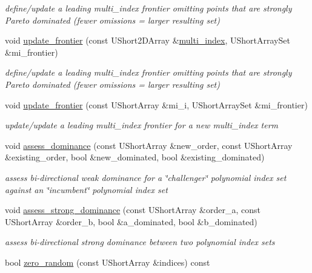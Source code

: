 \begin{DoxyCompactItemize}
\begin{DoxyCompactList}\small\item\em define/update a leading multi\+\_\+index frontier omitting points that are strongly Pareto dominated (fewer omissions = larger resulting set) \end{DoxyCompactList}\item 
void \hyperlink{classPecos_1_1SharedOrthogPolyApproxData_a133e0886ef37cddfd5236be9e89248ca}{update\+\_\+frontier} (const U\+Short2\+D\+Array \&\hyperlink{classPecos_1_1SharedOrthogPolyApproxData_ad93cb921a0df31fce4696f0051fe6a33}{multi\+\_\+index}, U\+Short\+Array\+Set \&mi\+\_\+frontier)\label{classPecos_1_1SharedOrthogPolyApproxData_a133e0886ef37cddfd5236be9e89248ca}

\begin{DoxyCompactList}\small\item\em define/update a leading multi\+\_\+index frontier omitting points that are strongly Pareto dominated (fewer omissions = larger resulting set) \end{DoxyCompactList}\item 
void \hyperlink{classPecos_1_1SharedOrthogPolyApproxData_aac256db072ad293acc50eed9f21bb2b3}{update\+\_\+frontier} (const U\+Short\+Array \&mi\+\_\+i, U\+Short\+Array\+Set \&mi\+\_\+frontier)\label{classPecos_1_1SharedOrthogPolyApproxData_aac256db072ad293acc50eed9f21bb2b3}

\begin{DoxyCompactList}\small\item\em update/update a leading multi\+\_\+index frontier for a new multi\+\_\+index term \end{DoxyCompactList}\item 
void \hyperlink{classPecos_1_1SharedOrthogPolyApproxData_a7b76d1a54906815bfdd2de208f7f0cc2}{assess\+\_\+dominance} (const U\+Short\+Array \&new\+\_\+order, const U\+Short\+Array \&existing\+\_\+order, bool \&new\+\_\+dominated, bool \&existing\+\_\+dominated)
\begin{DoxyCompactList}\small\item\em assess bi-\/directional weak dominance for a \char`\"{}challenger\char`\"{} polynomial index set against an \char`\"{}incumbent\char`\"{} polynomial index set \end{DoxyCompactList}\item 
void \hyperlink{classPecos_1_1SharedOrthogPolyApproxData_a1d206c4e650831c15ed5d59a4ecb3ae7}{assess\+\_\+strong\+\_\+dominance} (const U\+Short\+Array \&order\+\_\+a, const U\+Short\+Array \&order\+\_\+b, bool \&a\+\_\+dominated, bool \&b\+\_\+dominated)
\begin{DoxyCompactList}\small\item\em assess bi-\/directional strong dominance between two polynomial index sets \end{DoxyCompactList}\item 
bool \hyperlink{classPecos_1_1SharedOrthogPolyApproxData_acde7b33e8905ee78af8b29389c527712}{zero\+\_\+random} (const U\+Short\+Array \&indices) const \label{classPecos_1_1SharedOrthogPolyApproxData_acde7b33e8905ee78af8b29389c527712}


\end{DoxyCompactItemize}

